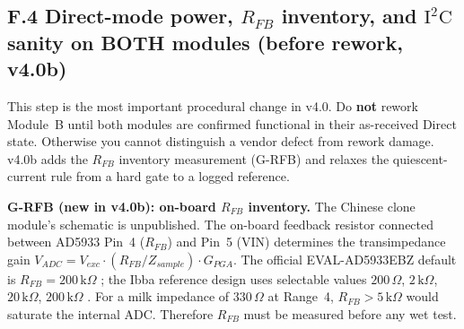 \documentclass[11pt,a4paper]{article}
\newcommand{\kohm}[1]{\ensuremath{#1\,\mathrm{k}\Omega}}
\newcommand{\Rohm}[1]{\ensuremath{#1\,\Omega}}
\begin{document}
\subsection{F.4 \textbf{Direct-mode power, $R_{FB}$ inventory, and $\mathrm{I^2C}$ sanity on BOTH modules (before rework, v4.0b)}}

\begin{rulebox}
This step is the most important procedural change in v4.0. Do \textbf{not} rework Module~B until both modules are confirmed functional in their as-received Direct state. Otherwise you cannot distinguish a vendor defect from rework damage. v4.0b adds the $R_{FB}$ inventory measurement (G-RFB) and relaxes the quiescent-current rule from a hard gate to a logged reference.
\end{rulebox}

\textbf{G-RFB (new in v4.0b): on-board $R_{FB}$ inventory.} The Chinese clone module's schematic is unpublished. The on-board feedback resistor connected between AD5933 Pin~4 ($R_{FB}$) and Pin~5 (VIN) determines the transimpedance gain $V_{ADC}=V_{exc}\cdot(R_{FB}/Z_{sample})\cdot G_{PGA}$. The official EVAL-AD5933EBZ default is $R_{FB}=\kohm{200}$ \cite{ug364,ad5933ds}; the Ibba reference design uses selectable values \Rohm{200}, \kohm{2}, \kohm{20}, \kohm{200} \cite{ibba2021}. For a milk impedance of \Rohm{330} at Range~4, $R_{FB}>\kohm{5}$ would saturate the internal ADC. Therefore $R_{FB}$ must be measured before any wet test.
\end{document}

